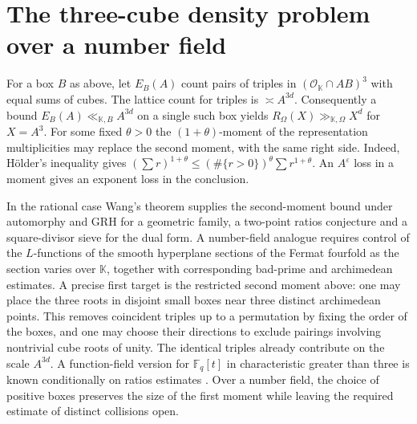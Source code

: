 \documentclass[11pt,letterpaper]{article}
\theoremstyle{definition}
\numberwithin{equation}{section}
\begin{document}
\section{The three-cube density problem over a number field}\label{sec:field-cube-outlook}

For a box $B$ as above, let $E_B(A)$ count pairs of triples in
$(\mathcal O_{\mathbb K}\cap AB)^3$ with equal sums of cubes.
The lattice count for triples is $\asymp A^{3d}$. Consequently a bound
$E_B(A)\ll_{\mathbb K,B}A^{3d}$ on a single such box yields
$R_\Omega(X)\gg_{\mathbb K,\Omega} X^d$ for $X=A^3$.
For some fixed $\theta>0$ the
$(1+\theta)$-moment of the representation multiplicities may replace the second
moment, with the same right side. Indeed, H\"older's inequality gives
$(\sum r)^{1+\theta}\le (\#\{r>0\})^\theta\sum r^{1+\theta}$.
An $A^\varepsilon$ loss in a moment gives an exponent loss in the conclusion.

In the rational case Wang's theorem \cite[Theorem 1.7]{c3:wang} supplies
the second-moment bound under automorphy and GRH for a geometric family,
a two-point ratios conjecture and a square-divisor sieve for the dual form.
A number-field analogue requires control of the $L$-functions of the
smooth hyperplane sections of the Fermat fourfold as the section varies
over $\mathbb K$, together with corresponding bad-prime and archimedean
estimates. A precise first target is the restricted second moment above:
one may place the three roots in disjoint small boxes near three distinct
archimedean points. This removes coincident triples up to a permutation by
fixing the order of the boxes, and one may choose their directions to
exclude pairings involving nontrivial cube roots of unity. The identical
triples already contribute on the scale $A^{3d}$.
A function-field version for $\mathbb F_q[t]$ in characteristic greater
than three is known conditionally on ratios estimates
\cite{nf3:bgw}. Over a number field, the choice of positive boxes preserves
the size of the first moment while leaving the required estimate of
distinct collisions open.
\end{document}
